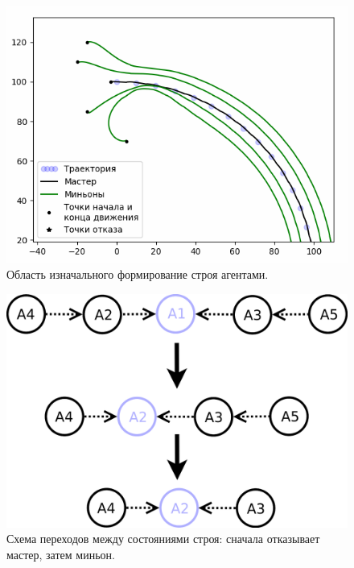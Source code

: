 \documentclass[a4paper, 14pt]{extarticle}
\begin{document}
\begin{figure}
	\centering
	\includegraphics[width=0.7\linewidth]{platoon/with-crashes-zoom2}
	\caption{Область изначального формирование строя агентами.}
	\label{fig:with-crashes-zoom2}
\end{figure}
\begin{figure}
	\centering
	\includegraphics[width=0.7\linewidth]{platoon/with-crashes-diagram}
	\caption{Схема переходов между состояниями строя: сначала отказывает мастер, затем миньон.}
	\label{fig:with-crashes-diagram}
\end{figure}
\end{document}
